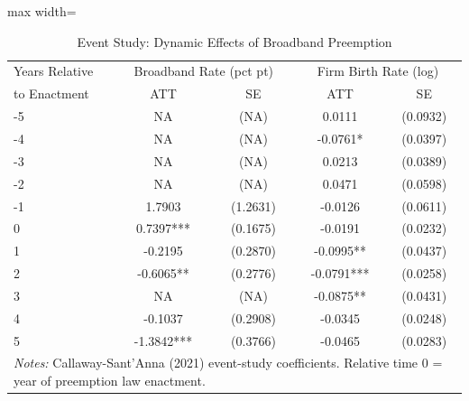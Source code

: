 \begin{table}[htbp]
\centering
\caption{Event Study: Dynamic Effects of Broadband Preemption}
\label{tab:eventstudy}
\begin{adjustbox}{max width=\textwidth}\small\begin{tabular}{lcccc}
\hline\hline
Years Relative & \multicolumn{2}{c}{Broadband Rate (pct pt)} & \multicolumn{2}{c}{Firm Birth Rate (log)} \\
to Enactment & ATT & SE & ATT & SE \\
\hline
-5 & NA & (NA) & 0.0111 & (0.0932) \\
-4 & NA & (NA) & -0.0761* & (0.0397) \\
-3 & NA & (NA) & 0.0213 & (0.0389) \\
-2 & NA & (NA) & 0.0471 & (0.0598) \\
-1 & 1.7903 & (1.2631) & -0.0126 & (0.0611) \\
0 & 0.7397*** & (0.1675) & -0.0191 & (0.0232) \\
1 & -0.2195 & (0.2870) & -0.0995** & (0.0437) \\
2 & -0.6065** & (0.2776) & -0.0791*** & (0.0258) \\
3 & NA & (NA) & -0.0875** & (0.0431) \\
4 & -0.1037 & (0.2908) & -0.0345 & (0.0248) \\
5 & -1.3842*** & (0.3766) & -0.0465 & (0.0283) \\
\hline
\multicolumn{5}{l}{\textit{Notes:} Callaway-Sant'Anna (2021) event-study coefficients. Relative time 0 = year of preemption law enactment.} \\
\hline
\end{tabular}\end{adjustbox}
\end{table}

